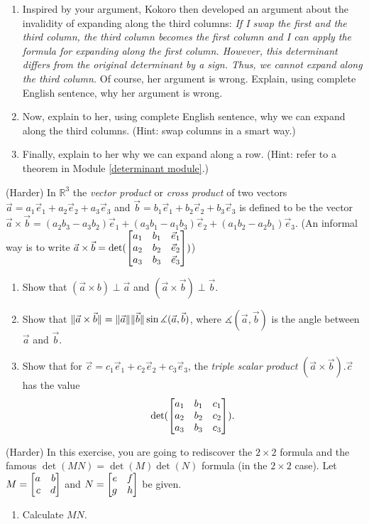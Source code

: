 \begin{exercises}
\begin{problist}
\begin{enumerate}
			\item Inspired by your argument, Kokoro then developed an argument
				about the invalidity of expanding along the third columns: \textit{If
				I swap the first and the third column, the third column becomes
				the first column and I can apply the formula for expanding along
				the first column. However, this determinant differs from the
				original determinant by a sign. Thus, we cannot expand along the
				third column.} Of course, her argument is wrong. Explain, using complete
				English sentence, why her argument is wrong.

			\item Now, explain to her, using complete English sentence, why we
				can expand along the third columns. (Hint: swap columns in a smart
				way.)

			\item Finally, explain to her why we can expand along a row. (Hint: refer
				to a theorem in Module \ref{determinant module}.)
		\end{enumerate}
		\prob (Harder) In $\mathbb{R}^{3}$ the \textit{vector product} or
		\textit{cross product} of two vectors $\vec{a}=a_{1}\vec{e}_{1}+a_{2}\vec
		{e}_{2}+a_{3}\vec{e}_{3}$ and $\vec{b}=b_{1}\vec{e}_{1}+b_{2}\vec{e}_{2}+
		b_{3}\vec{e}_{3}$ is defined to be the vector $\vec{a}\times \vec{b}=(a_{2}
		b_{3}-a_{3}b_{2})\vec{e}_{1}+(a_{3}b_{1}-a_{1}b_{3})\vec{e}_{2}+(a_{1}b_{2}
		-a_{2}b_{1})\vec{e}_{3}$. (An informal way is to write $\vec{a}\times \vec
		{b}=\det(\mat{a_1 & b_1 & \vec e_1 \\ a_2 & b_2 & \vec e_2 \\ a_3 & b_3 & \vec e_3}
		)$)
		\begin{enumerate}
			\item Show that $(\vec{a}\times b)\perp\vec{a}$ and $(\vec{a}\times \vec
				{b})\perp \vec{b}$.

			\item Show that $\lVert\vec{a}\times\vec{b}\rVert=\lVert\vec{a}\rVert\lVert\vec{b}\rVert
				\sin\measuredangle(\vec{a},\vec{b})$, where
				$\measuredangle(\vec{a},\vec{b})$ is the angle between $\vec{a}$
				and $\vec{b}$.

			\item Show that for $\vec{c}=c_{1}\vec{e}_{1}+c_{2}\vec{e}_{2}+c_{3}\vec
				{e}_{3}$, the \textit{triple scalar product} $(\vec a\times \vec
				b). \vec c$ has the value
				\[
					\det(\mat{a_1 & b_1 & c_1 \\ a_2 & b_2 & c_2 \\ a_3 & b_3 & c_3}).
				\]
		\end{enumerate}
		\prob (Harder) In this exercise, you are going to rediscover the $2\times
		2$ formula and the famous $\det(MN)=\det(M)\det(N)$ formula (in the
		$2\times 2$ case). Let $M=\mat{a & b \\ c & d}$ and
		$N=\mat{e & f \\ g & h}$ be given.
		\begin{enumerate}
			\item Calculate $MN$.


\end{enumerate}
\end{problist}
\end{exercises}
